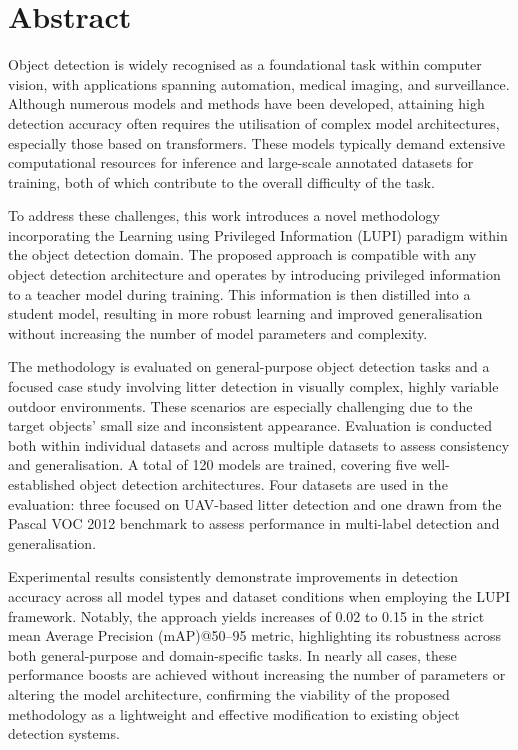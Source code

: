\chapter*{Abstract}

Object detection is widely recognised as a foundational task within computer vision, with applications spanning automation, medical imaging, and surveillance. Although numerous models and methods have been developed, attaining high detection accuracy often requires the utilisation of complex model architectures, especially those based on transformers. These models typically demand extensive computational resources for inference and large-scale annotated datasets for training, both of which contribute to the overall difficulty of the task.

To address these challenges, this work introduces a novel methodology incorporating the Learning using Privileged Information (LUPI) paradigm within the object detection domain. The proposed approach is compatible with any object detection architecture and operates by introducing privileged information to a teacher model during training. This information is then distilled into a student model, resulting in more robust learning and improved generalisation without increasing the number of model parameters and complexity.

The methodology is evaluated on general-purpose object detection tasks and a focused case study involving litter detection in visually complex, highly variable outdoor environments. These scenarios are especially challenging due to the target objects' small size and inconsistent appearance. Evaluation is conducted both within individual datasets and across multiple datasets to assess consistency and generalisation. A total of 120 models are trained, covering five well-established object detection architectures. Four datasets are used in the evaluation: three focused on UAV-based litter detection and one drawn from the Pascal VOC 2012 benchmark to assess performance in multi-label detection and generalisation.

Experimental results consistently demonstrate improvements in detection accuracy across all model types and dataset conditions when employing the LUPI framework. Notably, the approach yields increases of 0.02 to 0.15 in the strict mean Average Precision (mAP)@50--95 metric, highlighting its robustness across both general-purpose and domain-specific tasks. In nearly all cases, these performance boosts are achieved without increasing the number of parameters or altering the model architecture, confirming the viability of the proposed methodology as a lightweight and effective modification to existing object detection systems.


